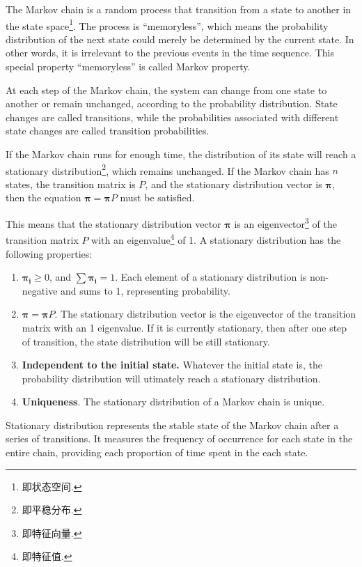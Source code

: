 \documentclass[lettersize,journal,12pt,conference]{IEEEtran}
\begin{document}
The Markov chain is a random process that transition from a state to another in the state space\footnote[3]{即状态空间.}. The process is ``memoryless'', which means the probability distribution of the next state could merely be determined by the current state. In other words, it is irrelevant to the previous events in the time sequence. This special property ``memoryless'' is called Markov property. 

At each step of the Markov chain, the system can change from one state to another or remain unchanged, according to the probability distribution. State changes are called transitions, while the probabilities associated with different state changes are called transition probabilities.

If the Markov chain runs for enough time, the distribution of its state will reach a stationary distribution\footnote[1]{即平稳分布.}, which remains unchanged. If the Markov chain has $n$ states, the transition matrix is $P$, and the stationary distribution vector is $\boldsymbol{\pi}$, then the equation $\boldsymbol{\pi} = \boldsymbol{\pi} P$ must be satisfied.

This means that the stationary distribution vector $\boldsymbol{\pi}$ is an eigenvector\footnote[2]{即特征向量.} of the transition matrix $P$ with an eigenvalue\footnote[3]{即特征值.} of 1. A stationary distribution has the following properties:
\begin{enumerate}
	\item [1.] $\boldsymbol{\pi_i}\geq0$, and $\sum\boldsymbol{\pi_i}=1$. Each element of a stationary distribution is non-negative and sums to 1, representing probability.
	\item [2.] $\boldsymbol{\pi} = \boldsymbol{\pi} P$. The stationary distribution vector is the eigenvector of the transition matrix with an 1 eigenvalue. If it is currently stationary, then after one step of transition, the state distribution will be still stationary.
	\item [3.] \textbf{Independent to the initial state.} Whatever the initial state is, the probability distribution will utimately reach a stationary distribution.
	\item [4.] \textbf{Uniqueness}. The stationary distribution of a Markov chain is unique.
\end{enumerate}

Stationary distribution represents the stable state of the Markov chain after a series of transitions.
It measures the frequency of occurrence for each state in the entire chain, providing each proportion of time spent in the each state.
\end{document}
